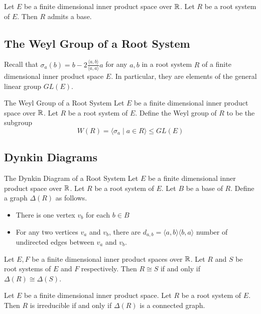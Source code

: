 \documentclass[a4paper]{article}
\begin{document}
\begin{prp}{}{} Let $E$ be a finite dimensional inner product space over $\mathbb{R}$. Let $R$ be a root system of $E$. Then $R$ admits a base. 
\end{prp}

\subsection{The Weyl Group of a Root System}
Recall that $\sigma_a(b)=b-2\frac{\langle a,b\rangle}{\langle a,a\rangle}a$ for any $a,b$ in a root system $R$ of a finite dimensional inner product space $E$. In particular, they are elements of the general linear group $GL(E)$. 

\begin{defn}{The Weyl Group of a Root System}{} Let $E$ be a finite dimensional inner product space over $\mathbb{R}$. Let $R$ be a root system of $E$. Define the Weyl group of $R$ to be the subgroup $$W(R)=\langle\sigma_a\;|\;a\in R\rangle\leq GL(E)$$
\end{defn}

\subsection{Dynkin Diagrams}
\begin{defn}{The Dynkin Diagram of a Root System}{} Let $E$ be a finite dimensional inner product space over $\mathbb{R}$. Let $R$ be a root system of $E$. Let $B$ be a base of $R$. Define a graph $\Delta(R)$ as follows. 
\begin{itemize}
\item There is one vertex $v_b$ for each $b\in B$
\item For any two vertices $v_a$ and $v_b$, there are $d_{a,b}=\langle a,b\rangle\langle b,a\rangle$ number of undirected edges between $v_a$ and $v_b$. 
\end{itemize}
\end{defn}

\begin{prp}{}{} Let $E,F$ be a finite dimensional inner product spaces over $\mathbb{R}$. Let $R$ and $S$ be root systems of $E$ and $F$ respectively. Then $R\cong S$ if and only if $\Delta(R)\cong\Delta(S)$. 
\end{prp}

\begin{prp}{}{} Let $E$ be a finite dimensional inner product space. Let $R$ be a root system of $E$. Then $R$ is irreducible if and only if $\Delta(R)$ is a connected graph. 
\end{prp}
\end{document}
